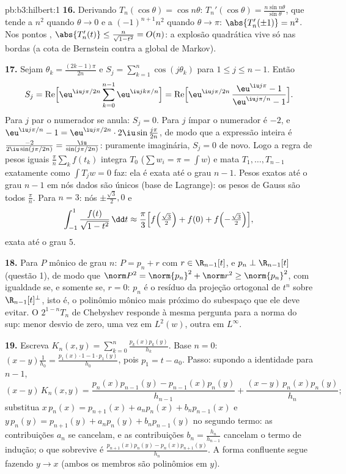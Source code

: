 \begin{solution}{pb:b3:hilbert:1}
\textbf{16.} Derivando $T_n(\cos\theta) = \cos
n\theta$: $T_n'(\cos\theta) = \frac{n\sin n\theta}
{\sin\theta}$, que tende a $n^2$ quando $\theta \to 0$ e a
$(-1)^{n+1}n^2$ quando $\theta \to \pi$: $\abs{T_n'(\pm1)} =
n^2$. Nos pontos , $\abs{T_n'(t)} \leq
\frac{n}{\sqrt{1 - t^2}} = O(n)$: a explosão quadrática
vive só nas bordas (a cota  de Bernstein contra
a global de Markov).

\textbf{17.} Sejam $\theta_k = \frac{(2k-1)\pi}{2n}$ e $S_j
= \sum_{k=1}^n\cos(j\theta_k)$ para $1 \leq j \leq n-1$. Então
\[
S_j = \operatorname{Re}\Bigl[\eu^{\iu j\pi/2n}
\sum_{k=0}^{n-1}\eu^{\iu jk\pi/n}\Bigr]
= \operatorname{Re}\Bigl[\eu^{\iu j\pi/2n}\,
\frac{\eu^{\iu j\pi} - 1}{\eu^{\iu j\pi/n} - 1}\Bigr] .
\]
Para $j$ par o numerador se anula: $S_j = 0$. Para $j$ ímpar
o numerador é $-2$, e $\eu^{\iu j\pi/n} - 1 =
\eu^{\iu j\pi/2n}\cdot2\iu\sin\frac{j\pi}{2n}$, de modo que a expressão inteira
é $\frac{-2}{2\iu\sin(j\pi/2n)} =
\frac{\iu}{\sin(j\pi/2n)}$: puramente imaginária, $S_j = 0$
de novo. Logo a regra de pesos iguais $\frac\pi n\sum_kf(t_k)$
integra $T_0$ ($\sum w_i = \pi = \int w$) e mata $T_1,
\dots, T_{n-1}$ exatamente como $\int T_jw = 0$ faz: ela é exata
até o grau $n - 1$. Pesos exatos até o grau $n-1$ em nós
dados são únicos (base de Lagrange): os pesos de Gauss são todos
$\frac\pi n$. Para $n = 3$: nós $\pm\frac{\sqrt3}2, 0$ e
\[
\int_{-1}^1\frac{f(t)}{\sqrt{1 - t^2}}\,\dd t \approx
\frac\pi3\Bigl[f\Bigl(\tfrac{\sqrt3}2\Bigr) + f(0) +
f\Bigl(-\tfrac{\sqrt3}2\Bigr)\Bigr],
\]
exata até o grau $5$.

\textbf{18.} Para $P$ mônico de grau $n$: $P = p_n + r$
com $r \in \R_{n-1}[t]$, e $p_n \perp \R_{n-1}[t]$
(questão 1), de modo que $\norm P^2 = \norm{p_n}^2 + \norm r^2 \geq
\norm{p_n}^2$, com igualdade se, e somente se, $r = 0$: $p_n$ é o
resíduo da projeção ortogonal de $t^n$ sobre
$\R_{n-1}[t]^\perp$, isto é, o polinômio mônico mais próximo do
subespaço que ele deve evitar. O $2^{1-n}T_n$ de Chebyshev responde
à mesma pergunta para a norma do sup: menor desvio de
zero, uma vez em $L^2(w)$, outra em $L^\infty$.

\textbf{19.} Escreva $K_n(x, y) =
\sum_{k=0}^n\frac{p_k(x)p_k(y)}{h_k}$. Base $n = 0$: $(x -
y)\frac1{h_0} = \frac{p_1(x)\cdot1 - 1\cdot p_1(y)}{h_0}$,
pois $p_1 = t - a_0$. Passo: supondo a identidade para $n -
1$,
\[
(x - y)\,K_n(x,y) = \frac{p_n(x)p_{n-1}(y) -
p_{n-1}(x)p_n(y)}{h_{n-1}} +
\frac{(x - y)\,p_n(x)p_n(y)}{h_n} ;
\]
substitua $x\,p_n(x) = p_{n+1}(x) + a_np_n(x) +
b_np_{n-1}(x)$ e $y\,p_n(y) = p_{n+1}(y) + a_np_n(y) +
b_np_{n-1}(y)$ no segundo termo: as contribuições $a_n$ se
cancelam, e as contribuições $b_n = \frac{h_n}{h_{n-1}}$
cancelam o termo de indução; o que sobrevive é
$\frac{p_{n+1}(x)p_n(y) - p_n(x)p_{n+1}(y)}{h_n}$. A
forma confluente segue fazendo $y \to x$ (ambos os membros são
polinômios em $y$).


\end{solution}
